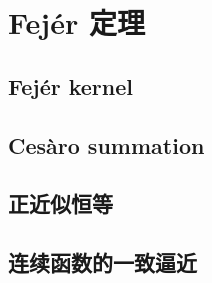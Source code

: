 \section{Fejér 定理}
\label{b2:sec:0204}


\subsection{Fejér kernel}
\label{b2:subsec:020401}

\subsection{Cesàro summation}
\label{b2:subsec:020402}

\subsection{正近似恒等}
\label{b2:subsec:020403}

\subsection{连续函数的一致逼近}
\label{b2:subsec:020404}


